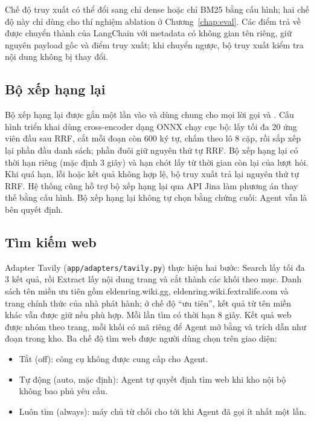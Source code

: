 Chế độ truy xuất có thể đổi sang chỉ dense hoặc chỉ BM25 bằng cấu hình; hai chế độ này chỉ dùng cho thí nghiệm ablation ở Chương~\ref{chap:eval}. Các điểm trả về được chuyển thành  của LangChain với metadata có không gian tên riêng, giữ nguyên payload gốc và điểm truy xuất; khi chuyển ngược, bộ truy xuất kiểm tra nội dung không bị thay đổi.

\subsection{Bộ xếp hạng lại}
\label{sec:impl_rerank}

Bộ xếp hạng lại được gắn một lần vào  và dùng chung cho mọi lời gọi  và . Cấu hình triển khai dùng cross-encoder  dạng ONNX chạy cục bộ: lấy tối đa 20 ứng viên đầu sau RRF, cắt mỗi đoạn còn 600 ký tự, chấm theo lô 8 cặp, rồi sắp xếp lại phần đầu danh sách; phần đuôi giữ nguyên thứ tự RRF. Bộ xếp hạng lại có thời hạn riêng (mặc định 3 giây) và hạn chót lấy từ thời gian còn lại của lượt hỏi. Khi quá hạn, lỗi hoặc kết quả không hợp lệ, bộ truy xuất trả lại nguyên thứ tự RRF. Hệ thống cũng hỗ trợ bộ xếp hạng lại qua API Jina làm phương án thay thế bằng cấu hình. Bộ xếp hạng lại không tự chọn bằng chứng cuối: Agent vẫn là bên quyết định.

\subsection{Tìm kiếm web}
\label{sec:impl_web}

Adapter Tavily (\nolinkurl{app/adapters/tavily.py}) thực hiện hai bước: Search lấy tối đa 3 kết quả, rồi Extract lấy nội dung trang và cắt thành các khối theo mục. Danh sách tên miền ưu tiên gồm eldenring.wiki.gg, eldenring.wiki.fextralife.com và trang chính thức của nhà phát hành; ở chế độ ``ưu tiên'', kết quả từ tên miền khác vẫn được giữ nếu phù hợp. Mỗi lần tìm có thời hạn 8 giây. Kết quả web được nhóm theo trang, mỗi khối có mã riêng để Agent mở bằng  và trích dẫn như đoạn trong kho. Ba chế độ tìm web được người dùng chọn trên giao diện:
\begin{itemize}
    \item Tắt (off): công cụ  không được cung cấp cho Agent.
    \item Tự động (auto, mặc định): Agent tự quyết định tìm web khi kho nội bộ không bao phủ yêu cầu.
    \item Luôn tìm (always): máy chủ từ chối  cho tới khi Agent đã gọi  ít nhất một lần.
\end{itemize}

